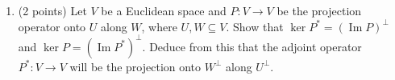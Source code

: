 \documentclass{article}
\begin{document}
\begin{enumerate}
  (a)
  \[
  \begin{pmatrix}
  5 & 1 & 8 \\
  7 & 5 & 4
  \end{pmatrix}
  \]
  
  (b)
  \[
  \begin{pmatrix}
  1 & 1 & 2 & 2 \\
  2 & 2 & 1 & 1
  \end{pmatrix}
  \]
  
  \item (2 points) Let $V$ be a Euclidean space and $P: V \to V$ be the projection operator onto $U$ along $W$, where $U, W \subseteq V$. Show that $\ker P^* = (\operatorname{Im} P)^\perp$ and $\ker P = (\operatorname{Im} P^*)^\perp$. Deduce from this that the adjoint operator $P^*: V \to V$ will be the projection onto $W^\perp$ along $U^\perp$.
\end{enumerate}
\end{document}
